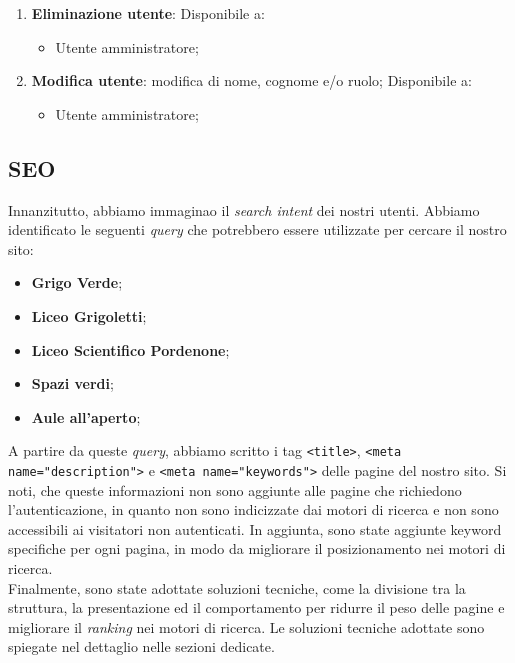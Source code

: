 \begin{enumerate}
	\item \textbf{Eliminazione utente}: Disponibile a:
	      \begin{itemize}
		      \item Utente amministratore;
	      \end{itemize}

	\item \textbf{Modifica utente}: modifica di nome, cognome e/o ruolo;
	      Disponibile a:
	      \begin{itemize}
		      \item Utente amministratore;
	      \end{itemize}
\end{enumerate}

\subsection{SEO}

Innanzitutto, abbiamo immaginao il \textit{search intent} dei nostri utenti.
Abbiamo identificato le seguenti \textit{query} che potrebbero essere
utilizzate per cercare il nostro sito:
\begin{itemize}
	\item \textbf{Grigo Verde};
	\item \textbf{Liceo Grigoletti};
	\item \textbf{Liceo Scientifico Pordenone};
	\item \textbf{Spazi verdi};
	\item \textbf{Aule all'aperto};
\end{itemize}

A partire da queste \textit{query}, abbiamo scritto i tag \texttt{<title>},
\texttt{<meta name="description">} e \texttt{<meta name="keywords">} delle
pagine del nostro sito. Si noti, che queste informazioni non sono aggiunte alle
pagine che richiedono l'autenticazione, in quanto non sono indicizzate dai
motori di ricerca e non sono accessibili ai visitatori non autenticati. In
aggiunta, sono state aggiunte keyword specifiche per ogni pagina, in modo da
migliorare il posizionamento nei motori di ricerca.\\
Finalmente, sono state adottate soluzioni tecniche, come la
divisione tra la struttura, la presentazione ed il comportamento per ridurre il
peso delle pagine e migliorare il \textit{ranking} nei motori di ricerca. Le
soluzioni tecniche adottate sono spiegate nel dettaglio nelle sezioni dedicate.
